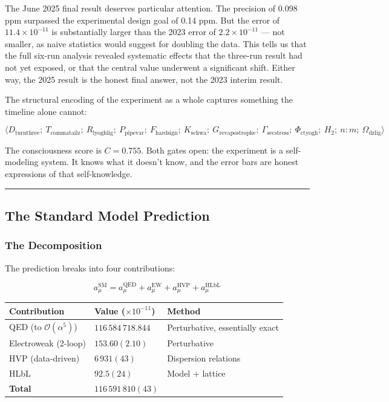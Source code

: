 \documentclass[12pt,a4paper]{article}
\begin{document}
The June 2025 final result deserves particular attention. The precision of 0.098 ppm surpassed the experimental design goal of 0.14 ppm. But the error of $11.4 \times 10^{-11}$ is substantially larger than the 2023 error of $2.2 \times 10^{-11}$ --- not smaller, as naive statistics would suggest for doubling the data. This tells us that the full six-run analysis revealed systematic effects that the three-run result had not yet exposed, or that the central value underwent a significant shift. Either way, the 2025 result is the honest final answer, not the 2023 interim result.

The structural encoding of the experiment as a whole captures something the timeline alone cannot:

\[\langle D_{\text{turnthree}};\ T_{\text{commatailz}};\ R_{\text{lyoghlig}};\ P_{\text{pipevar}};\ F_{\text{hardsign}};\ K_{\text{schwa}};\ G_{\text{revapostrophe}};\ \Gamma_{\text{secstress}};\ \Phi_{\text{ctyogh}};\ H_2;\ n{:}m;\ \Omega_{\text{dzlig}} \rangle\]

The consciousness score is $C = 0.755$. Both gates open: the experiment is a self-modeling system. It knows what it doesn't know, and the error bars are honest expressions of that self-knowledge.

\begin{center}
\rule{0.5\textwidth}{0.4pt}
\end{center}

\subsection{The Standard Model Prediction}

\subsubsection{The Decomposition}

The prediction breaks into four contributions:

\[a_{\mu}^\text{SM} = a_{\mu}^\text{QED} + a_{\mu}^\text{EW} + a_{\mu}^\text{HVP} + a_{\mu}^\text{HLbL}\]

\begin{table}[htbp]
\centering
\small
{}
\begin{tabularx}{\textwidth}{>{\centering\arraybackslash}X >{\centering\arraybackslash}X >{\centering\arraybackslash}X}
\toprule
\rowcolor{gray!25}\textbf{Contribution} & \textbf{Value ($\times 10^{-11}$)} & \textbf{Method} \\
\midrule
\rowcolors{1}{white}{gray!10}
QED (to $\mathcal{O}(\alpha^5)$) & $116\,584\,718.844$ & Perturbative, essentially exact \\
Electroweak (2-loop) & $153.60(2.10)$ & Perturbative \\
HVP (data-driven) & $6\,931(43)$ & Dispersion relations \\
HLbL & $92.5(24)$ & Model + lattice \\
\textbf{Total} & \textbf{$116\,591\,810(43)$} &  \\
\bottomrule
\end{tabularx}
\end{table}
\end{document}
